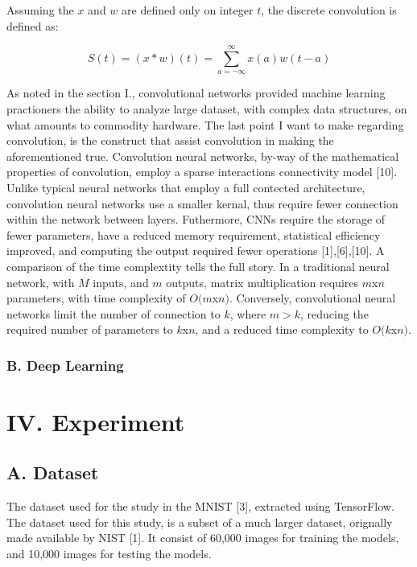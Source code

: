 \documentclass[conference,final,]{IEEEtran}
\begin{document}
Assuming the \(x\) and \(w\) are defined only on integer \(t\), the
discrete convolution is defined as:

\begin{equation}
    S(t) = (x*w)(t)=\sum\limits_{a=\neg\infty}^\infty{x(a)w(t-a)}
\end{equation}

As noted in the section I., convolutional networks provided machine
learning practioners the ability to analyze large dataset, with complex
data structures, on what amounts to commodity hardware. The last point I
want to make regarding convolution, is the construct that assist
convolution in making the aforementioned true. Convolution neural
networks, by-way of the mathematical properties of convolution, employ a
sparse interactions connectivity model {[}10{]}. Unlike typical neural
networks that employ a full contected architecture, convolution neural
networks use a smaller kernal, thus require fewer connection within the
network between layers. Futhermore, CNNs require the storage of fewer
parameters, have a reduced memory requirement, statistical efficiency
improved, and computing the output required fewer operations
{[}1{]},{[}6{]},{[}10{]}. A comparison of the time complextity tells the
full story. In a traditional neural network, with \(M\) inputs, and
\(m\) outputs, matrix multiplication requires \(m\)x\(n\) parameters,
with time complexity of \(O(m\)x\(n)\). Conversely, convolutional neural
networks limit the number of connection to \(k\), where \(m > k\),
reducing the required number of parameters to \(k\)x\(n\), and a reduced
time complexity to \(O(k\)x\(n)\).

\subsubsection{B. Deep Learning}\label{b.-deep-learning}

\section{IV. Experiment}\label{iv.-experiment}

\subsection{A. Dataset}\label{a.-dataset}

The dataset used for the study in the MNIST {[}3{]}, extracted using
TensorFlow. The dataset used for this study, is a subset of a much
larger dataset, orignally made available by NIST {[}1{]}. It consist of
60,000 images for training the models, and 10,000 images for testing the
models.
\end{document}
